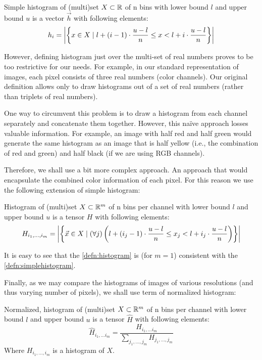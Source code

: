 \begin{defn}
\label{defn:simplehistogram}
Simple histogram of (multi)set $X \subset \mathbb{R}$ of n bins with lower bound $l$ and upper bound
$u$ is a vector $\vec{h}$ with following elements:
$$h_i = \left|{\left\{x \in X \mid l + (i-1) \cdot \frac{u-l}{n} \leq x < l + i \cdot \frac{u-l}{n}\right\}}\right|$$
\end{defn}

However, defining histogram just over the multi-set of real numbers proves to be too restrictive for our needs. For example, in our standard representation of images, each pixel consists of three real numbers (color channels). Our original definition allows only to draw histograms out of a set of real numbers (rather than triplets of real numbers).

One way to circumvent this problem is to draw a histogram from each channel separately and concatenate them together. However, this naïve approach losses valuable information. For example, an image with half red and half green would generate the same histogram as an image that is half yellow (i.e., the combination of red and green) and half black (if we are using RGB channels).

Therefore, we shall use a bit more complex approach. An approach that would encapsulate the combined color information of each pixel. For this reason we use the following extension of simple histogram:

\begin{defn}
\label{defn:histogram}
Histogram of (multi)set $X \subset \mathbb{R}^m$ of n bins per channel with lower bound
$l$ and upper bound $u$ is a tensor $H$ with following elements:
$$H_{i_1, \ldots, i_m} = \left|{\left\{\vec{x} \in X \mid (\forall j) \left(l + (i_j-1) \cdot \frac{u-l}{n} \leq x_j < l + i_j \cdot \frac{u-l}{n}\right)\right\}}\right|$$
\end{defn}

It is easy to see that the \autoref{defn:histogram} is (for $m = 1$)
consistent with the \autoref{defn:simplehistogram}.

Finally, as we may compare the histograms of images of various resolutions (and thus varying number of pixels), we shall use term of normalized histogram:

\begin{defn}
\label{defn:normhistogram}
Normalized, histogram of (multi)set $X \subset \mathbb{R}^m$ of n bins per channel with
lower bound $l$ and upper bound $u$ is a tensor $\widehat{H}$ with following
elements:
$$\widehat{H}_{i_1, \ldots i_m} = \frac{H_{i_1, \ldots i_m}}{\sum_{j_1, \ldots, j_m} H_{j_1, \ldots, j_m}}$$
Where $H_{i_1, \ldots, i_m}$ is a histogram of $X$.
\end{defn}


